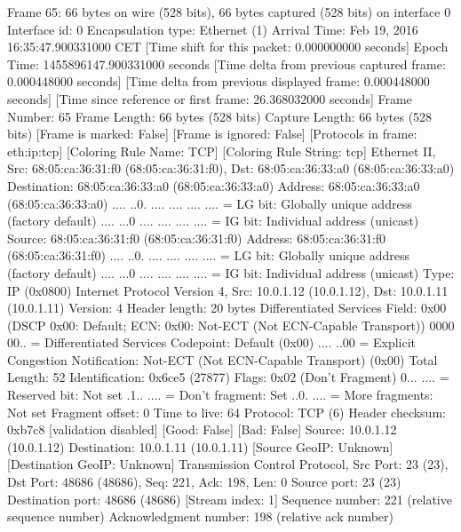 Frame 65: 66 bytes on wire (528 bits), 66 bytes captured (528 bits) on interface 0
    Interface id: 0
    Encapsulation type: Ethernet (1)
    Arrival Time: Feb 19, 2016 16:35:47.900331000 CET
    [Time shift for this packet: 0.000000000 seconds]
    Epoch Time: 1455896147.900331000 seconds
    [Time delta from previous captured frame: 0.000448000 seconds]
    [Time delta from previous displayed frame: 0.000448000 seconds]
    [Time since reference or first frame: 26.368032000 seconds]
    Frame Number: 65
    Frame Length: 66 bytes (528 bits)
    Capture Length: 66 bytes (528 bits)
    [Frame is marked: False]
    [Frame is ignored: False]
    [Protocols in frame: eth:ip:tcp]
    [Coloring Rule Name: TCP]
    [Coloring Rule String: tcp]
Ethernet II, Src: 68:05:ca:36:31:f0 (68:05:ca:36:31:f0), Dst: 68:05:ca:36:33:a0 (68:05:ca:36:33:a0)
    Destination: 68:05:ca:36:33:a0 (68:05:ca:36:33:a0)
        Address: 68:05:ca:36:33:a0 (68:05:ca:36:33:a0)
        .... ..0. .... .... .... .... = LG bit: Globally unique address (factory default)
        .... ...0 .... .... .... .... = IG bit: Individual address (unicast)
    Source: 68:05:ca:36:31:f0 (68:05:ca:36:31:f0)
        Address: 68:05:ca:36:31:f0 (68:05:ca:36:31:f0)
        .... ..0. .... .... .... .... = LG bit: Globally unique address (factory default)
        .... ...0 .... .... .... .... = IG bit: Individual address (unicast)
    Type: IP (0x0800)
Internet Protocol Version 4, Src: 10.0.1.12 (10.0.1.12), Dst: 10.0.1.11 (10.0.1.11)
    Version: 4
    Header length: 20 bytes
    Differentiated Services Field: 0x00 (DSCP 0x00: Default; ECN: 0x00: Not-ECT (Not ECN-Capable Transport))
        0000 00.. = Differentiated Services Codepoint: Default (0x00)
        .... ..00 = Explicit Congestion Notification: Not-ECT (Not ECN-Capable Transport) (0x00)
    Total Length: 52
    Identification: 0x6ce5 (27877)
    Flags: 0x02 (Don't Fragment)
        0... .... = Reserved bit: Not set
        .1.. .... = Don't fragment: Set
        ..0. .... = More fragments: Not set
    Fragment offset: 0
    Time to live: 64
    Protocol: TCP (6)
    Header checksum: 0xb7c8 [validation disabled]
        [Good: False]
        [Bad: False]
    Source: 10.0.1.12 (10.0.1.12)
    Destination: 10.0.1.11 (10.0.1.11)
    [Source GeoIP: Unknown]
    [Destination GeoIP: Unknown]
Transmission Control Protocol, Src Port: 23 (23), Dst Port: 48686 (48686), Seq: 221, Ack: 198, Len: 0
    Source port: 23 (23)
    Destination port: 48686 (48686)
    [Stream index: 1]
    Sequence number: 221    (relative sequence number)
    Acknowledgment number: 198    (relative ack number)
